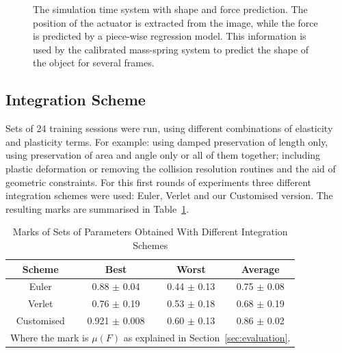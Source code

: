\documentclass[journal]{IEEEtran}
\newcommand{\tref}[1]{Table~\ref{#1}}
\newcommand{\sref}[1]{Section~\ref{#1}}
\begin{document}
\begin{figure}[!t]
\centering
\setlength\fboxsep{0pt}    %
\setlength\fboxrule{0.5pt} %
\caption{The simulation time system with shape and force prediction.  The position of the actuator is extracted from the image, while the force is predicted by a piece-wise regression model. This information is used by the calibrated mass-spring system to predict the shape of the object for several frames. }\label{fig:diagram}
\end{figure}

\subsection{Integration Scheme}
Sets of 24 training sessions were run, using different combinations of elasticity and plasticity terms.  For example: using damped preservation of length only, using preservation of area and angle only or all of them together;  including plastic deformation or removing the collision resolution routines and the aid of geometric constraints.  For this first rounds of experiments three different integration schemes were used: Euler, Verlet and our Customised version.  The resulting marks are summarised in \tref{tab:ischemes}.

\begin{table}[!t]
\renewcommand{\arraystretch}{1.3}
\caption{Marks of Sets of Parameters Obtained With Different Integration Schemes}
\label{tab:ischemes}
\centering
\begin{tabular}{cccc}
\hline
\bfseries Scheme & \bfseries Best & \bfseries Worst & \bfseries Average \\
\hline\hline
Euler & 0.88 $\pm$ 0.04 & 0.44 $\pm$ 0.13 & 0.75 $\pm$ 0.08 \\
Verlet & 0.76 $\pm$ 0.19 & 0.53 $\pm$ 0.18 & 0.68 $\pm$ 0.19 \\
Customised & 0.921 $\pm$ 0.008 & 0.60 $\pm$ 0.13 & 0.86 $\pm$ 0.02 \\
\hline
\multicolumn{4}{l}{Where the mark is $\mu(F)$ as explained in \sref{sec:evaluation}.}
\end{tabular}
\end{table}
\end{document}
